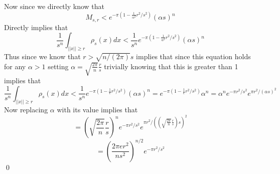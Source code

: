 \documentclass[12pt]{amsart}
\begin{document}
\begin{problem}
\begin{subproblem}
      Now since we directly know that 
      \[M_{s,r} < e^{-\pi(1-\frac1{\alpha^2}r^2/s^2)} (\alpha s)^n\]
      Directly implies that 
      \[\frac1{s^n}\int_{||x||\geq r}\rho_s(x)dx < \frac1{s^n}e^{-\pi(1-\frac1{\alpha^2}r^2/s^2)} (\alpha s)^n\]
      Thus since we know that $r>\sqrt{n/(2\pi)}s$ implies that since this equation holds for any $\alpha>1$ setting $\alpha = \sqrt{\frac{2\pi}n}\frac rs$ trivially knowing that this is greater than 1 implies that  
      \[\frac1{s^n}\int_{||x||\geq r}\rho_s(x)dx < \frac1{s^n}e^{-\pi(1-\frac1er^2/s^2)} (\alpha s)^n = e^{-\pi(1-\frac1er^2/s^2)}\alpha^n = \alpha^ne^{-\pi r^2/s^2}e^{\pi r^2/(\alpha s)^2}\]
      Now replacing $\alpha$ with its value implies that 
      \[= (\sqrt{\frac{2\pi}n}\frac rs)^ne^{-\pi r^2/s^2}e^{\pi r^2/((\sqrt{\frac{2\pi}n}\frac rs) s)^2}\]
      \[= (\frac{2\pi er^2}{ns^2})^{n/2} e^{-\pi r^2/s^2}\]\qed


    \end{subproblem}
  \end{problem}
\end{document}
